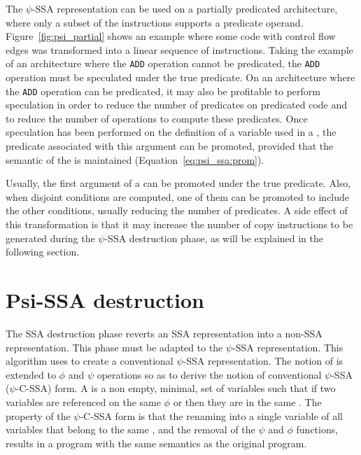The $\psi$-SSA representation can be used on a
  partially predicated architecture, where only a subset of the
  instructions supports a predicate operand.
  Figure~\ref{fig:psi_partial} shows an example where some code with
  control flow edges was transformed into a linear sequence of
  instructions.
%
Taking the example of an architecture where the \texttt{ADD} operation
cannot be predicated, the \texttt{ADD} operation must be speculated
under the {true} predicate. 
%
On an architecture where the \texttt{ADD} operation can be predicated, it
may also be profitable to perform speculation in order to reduce the
number of predicates on predicated code and to reduce the number of
operations to compute these predicates. 
%
Once speculation has been performed on the definition of a variable
used in a \psifun, the predicate associated with this argument
can be promoted, provided that the semantic of the \psifun is maintained (Equation~\ref{eq:psi_ssa:prom}). 



Usually, the first argument of a \psifun can be promoted
under the {true} predicate. Also, when disjoint conditions are
computed, one of them can be promoted to include the other conditions,
usually reducing the number of predicates. A side effect of this
transformation is that it may increase the number of copy instructions
to be generated during the $\psi$-SSA destruction phase,
as will be explained in the following section.


\section{Psi-SSA destruction}
\label{sec:Psi_ssa_destruction}



The SSA destruction phase reverts an SSA representation into a non-SSA
representation. This phase must be adapted to the $\psi$-SSA
representation. This algorithm uses
\phipsiwebs to create a conventional $\psi$-SSA
representation. The notion of \phiwebs is 
extended to $\phi$ and $\psi$ operations so as to derive the notion of
conventional $\psi$-SSA ($\psi$-C-SSA) form. A \phipsiweb is
a non empty, minimal, set of variables such that if two variables are
referenced on the same $\phi$ or \psifun then they are in the
same \phipsiweb. The property of the $\psi$-C-SSA form is that the
renaming into a single variable of all variables that belong to the
same \phipsiweb, and the removal of the $\psi$ and $\phi$
functions, results in a program with the same semantics as the
original program.

